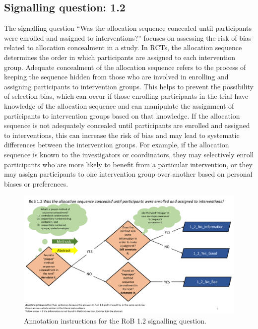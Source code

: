\documentclass[sn-mathphys,Numbered]{sn-jnl}%
\begin{document}
\subsection*{Signalling question: 1.2}
%
The signalling question ``Was the allocation sequence concealed until participants were enrolled and assigned to interventions?'' focuses on assessing the risk of bias related to allocation concealment in a study.
In RCTs, the allocation sequence determines the order in which participants are assigned to each intervention group.
Adequate concealment of the allocation sequence refers to the process of keeping the sequence hidden from those who are involved in enrolling and assigning participants to intervention groups.
This helps to prevent the possibility of selection bias, which can occur if those enrolling participants in the trial have knowledge of the allocation sequence and can manipulate the assignment of participants to intervention groups based on that knowledge.
If the allocation sequence is not adequately concealed until participants are enrolled and assigned to interventions, this can increase the risk of bias and may lead to systematic differences between the intervention groups.
For example, if the allocation sequence is known to the investigators or coordinators, they may selectively enroll participants who are more likely to benefit from a particular intervention, or they may assign participants to one intervention group over another based on personal biases or preferences.

%
%
%
\begin{figure}[hbt]
    \centering
    \includegraphics[width=\textwidth]{figures/1_2.pdf}
    \caption{Annotation instructions for the RoB 1.2 signalling question.}
    \label{fig:1_2}
\end{figure}
%
%
%
\end{document}
